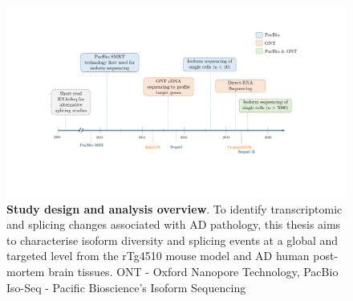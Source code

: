 \begin{landscape}
	\begin{figure}[htb]
		\begin{center}
			\includegraphics[page=2,trim={0 0 0 0},clip,scale = 0.7]{Figures/Introduction_Figures_Landscape.pdf}
		\end{center}
		\captionsetup{width=1.5\textwidth}
		\caption[Study design and analysis overview]%
		{\textbf{Study design and analysis overview}. To identify transcriptomic and splicing changes associated with AD pathology, this thesis aims to characterise isoform diversity and splicing events at a global and targeted level from the rTg4510 mouse model and AD human post-mortem brain tissues. ONT - Oxford Nanopore Technology, PacBio Iso-Seq - Pacific Bioscience's Isoform Sequencing}
		\label{fig:studydesign}
	\end{figure} 	
\end{landscape}